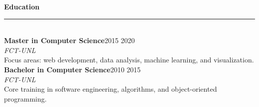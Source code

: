 \documentclass[10pt,a4paper]{article}
\newlength{\mainW}\setlength{\mainW}{142mm}
\newlength{\mainI}\setlength{\mainI}{126mm}
\newcommand{\mainsection}[1]{%
  \vspace{2pt}%
  {\small\bfseries\color{mainAccent}#1}\\[-5pt]
  \textcolor{mainRule}{\rule{\linewidth}{0.55pt}}\\[2pt]
}
\begin{document}
\begin{minipage}[t][297mm][t]{\mainW}
\begin{minipage}[t][279mm][t]{\mainI}
    \mainsection{Education}
    {\small\bfseries\color{textMain}Master in Computer Science}\hfill{\scriptsize\color{textSoft}2015 \textendash{} 2020}\\[-2pt]
    {\small\itshape\color{mainAccent}FCT-UNL\/}\\[-2pt]
    {\scriptsize\color{textSoft}Focus areas: web development, data analysis, machine learning, and visualization.}\\[3pt]
    {\small\bfseries\color{textMain}Bachelor in Computer Science}\hfill{\scriptsize\color{textSoft}2010 \textendash{} 2015}\\[-2pt]
    {\small\itshape\color{mainAccent}FCT-UNL\/}\\[-2pt]
    {\scriptsize\color{textSoft}Core training in software engineering, algorithms, and object-oriented programming.}\\[2pt]

  \end{minipage}%
\end{minipage}%
\end{document}
